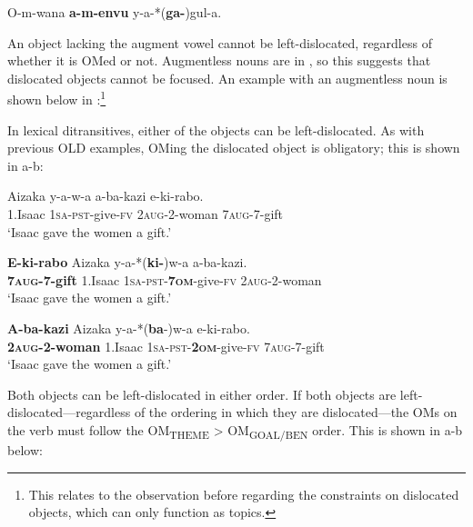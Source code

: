 \documentclass[output=paper
,newtxmath
,modfonts
,nonflat]{langsci/langscibook}
\begin{document}
\ex\label{ex:ranero:14b} O-m-wana \textbf{a-m-envu}   y-a-*(\textbf{ga-})gul-a.
\z
\z

An object lacking the augment vowel cannot be left-dislocated, regardless of whether it is OMed or not. Augmentless nouns are in  \citep{Hyman1993}, so this suggests that dislocated objects cannot be focused. An example with an augmentless noun is shown below in :\footnote{This relates to the observation before regarding the  constraints on dislocated objects, which can only function as topics.}

\z

In lexical ditransitives, either of the objects can be left-dislocated. As with previous OLD examples, OMing the dislocated object is obligatory; this is shown in a-b:

\ea\label{ex:ranero:16}
\gll Aizaka y-a-w-a           a-ba-kazi     e-ki-rabo.\\
1.Isaac \textsc{1sa-pst}{}-give-\textsc{fv} 2\textsc{aug}{}-2-woman 7\textsc{aug}{}-7-gift\\
\glt ‘Isaac gave the women a gift.’
\z

\ea\label{ex:ranero:17}
\ea\label{ex:ranero:17a}
\gll \textbf{E-ki-rabo}    Aizaka y-a-*(\textbf{ki-})w-a        a-ba-kazi.\\
\textbf{7\textsc{aug}}\textbf{{}-7-gift} 1.Isaac \textsc{1sa-pst}{}-\textbf{7\textsc{om}}{}-give-\textsc{fv} 2\textsc{aug}{}-2-woman\\
\glt ‘Isaac gave the women a gift.’

\ex\label{ex:ranero:17b}
\gll \textbf{A-ba-kazi}          Aizaka y-a-*(\textbf{ba}{}-)w-a              e-ki-rabo.\\
\textbf{2\textsc{aug}}\textbf{{}-2-woman} 1.Isaac \textsc{1sa-pst}{}-\textbf{2\textsc{om}}{}-give-\textsc{fv} 7\textsc{aug}{}-7-gift\\
\glt ‘Isaac gave the women a gift.’
\z
\z

Both objects can be left-dislocated in either order. If both objects are left-dislocated—regardless of the ordering in which they are dislocated—the OMs on the verb must follow the OM\textsubscript{THEME} > OM\textsubscript{GOAL/BEN} order. This is shown in a-b below:
\end{document}
